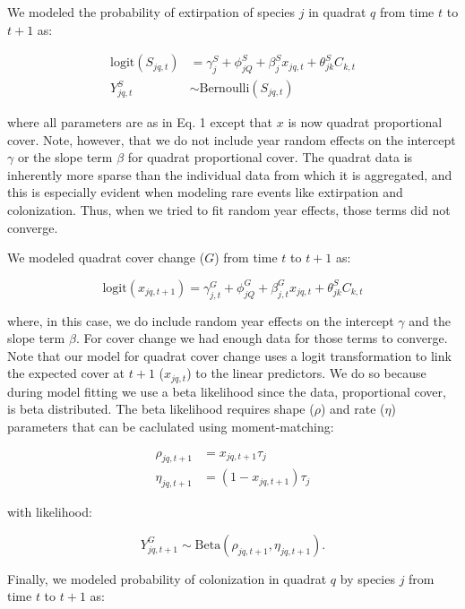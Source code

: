 \documentclass[12pt,]{article}
\begin{document}
We modeled the probability of extirpation of species $j$ in quadrat $q$
from time $t$ to $t+1$ as:

\begin{align}
\text{logit}(S_{jq,t}) &= \gamma^{S}_{j} + \phi^{S}_{jQ} + \beta^{S}_{j}x_{jq,t} + \theta^{S}_{jk}C_{k,t} \\
Y^{S}_{jq,t} &\sim \text{Bernoulli}(S_{jq,t})
\end{align}

where all parameters are as in Eq. 1 except that $x$ is now quadrat
proportional cover. Note, however, that we do not include year random
effects on the intercept $\gamma$ or the slope term $\beta$ for quadrat
proportional cover. The quadrat data is inherently more sparse than the
individual data from which it is aggregated, and this is especially
evident when modeling rare events like extirpation and colonization.
Thus, when we tried to fit random year effects, those terms did not
converge.

We modeled quadrat cover change ($G$) from time $t$ to $t+1$ as:

\begin{equation}
\text{logit}(x_{jq,t+1}) = \gamma^{G}_{j,t} + \phi^{G}_{jQ} + \beta^{G}_{j,t}x_{jq,t} + \theta^{S}_{jk}C_{k,t}
\end{equation}

where, in this case, we do include random year effects on the intercept
$\gamma$ and the slope term $\beta$. For cover change we had enough data
for those terms to converge. Note that our model for quadrat cover
change uses a logit transformation to link the expected cover at $t+1$
($x_{jq,t}$) to the linear predictors. We do so because during model
fitting we use a beta likelihood since the data, proportional cover, is
beta distributed. The beta likelihood requires shape ($\rho$) and rate
($\eta$) parameters that can be caclulated using moment-matching:

\begin{align}
\rho_{jq,t+1} &= x_{jq,t+1}\tau_{j} \\
\eta_{jq,t+1} &= (1-x_{jq,t+1})\tau_{j}
\end{align}

with likelihood:

\begin{equation}
Y^{G}_{jq,t+1} \sim \text{Beta}(\rho_{jq,t+1}, \eta_{jq,t+1}).
\end{equation}

Finally, we modeled probability of colonization in quadrat $q$ by
species $j$ from time $t$ to $t+1$ as:
\end{document}
